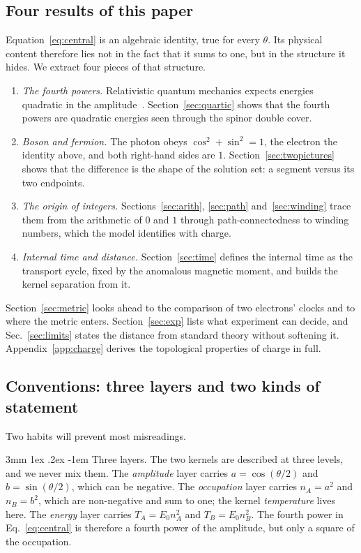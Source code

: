 \documentclass[%
 reprint, amsmath,amssymb, aps, prb, ]{revtex4-2}
\makeatletter
\numberwithin{equation}{section}
\renewcommand\paragraph{%
  \@startsection{paragraph}{4}{\z@}%
    {3mm \@plus 1ex \@minus .2ex}%
    {-1em}%
    {\normalfont\normalsize\itshape}}
\makeatother
\begin{document}
\subsection{Four results of this paper}

Equation~\eqref{eq:central} is an algebraic identity, true for every $\theta$. Its physical content therefore lies not in the fact that it sums to one, but in the structure it hides. We extract four pieces of that structure.
\begin{enumerate}[leftmargin=1.6em,itemsep=0.25em]
\item \emph{The fourth powers.} Relativistic quantum mechanics expects energies quadratic in the amplitude~\cite{ref:dirac28}. Section~\ref{sec:quartic} shows that the fourth powers are quadratic energies seen through the spinor double cover.
\item \emph{Boson and fermion.} The photon obeys $\cos^2+\sin^2=1$, the electron the identity above, and both right-hand sides are $1$. Section~\ref{sec:twopictures} shows that the difference is the shape of the solution set: a segment versus its two endpoints.
\item \emph{The origin of integers.} Sections~\ref{sec:arith}, \ref{sec:path} and~\ref{sec:winding} trace them from the arithmetic of $0$ and $1$ through path-connectedness to winding numbers, which the model identifies with charge.
\item \emph{Internal time and distance.} Section~\ref{sec:time} defines the internal time as the transport cycle, fixed by the anomalous magnetic moment, and builds the kernel separation from it.
\end{enumerate}
Section~\ref{sec:metric} looks ahead to the comparison of two electrons' clocks and to where the metric enters. Section~\ref{sec:exp} lists what experiment can decide, and Sec.~\ref{sec:limits} states the distance from standard theory without softening it. Appendix~\ref{app:charge} derives the topological properties of charge in full.

\subsection{Conventions: three layers and two kinds of statement}
\label{sec:conv}

Two habits will prevent most misreadings.

\paragraph{Three layers.} The two kernels are described at three levels, and we never mix them. The \emph{amplitude} layer carries $a=\cos(\theta/2)$ and $b=\sin(\theta/2)$, which can be negative. The \emph{occupation} layer carries $n_A=a^2$ and $n_B=b^2$, which are non-negative and sum to one; the kernel \emph{temperature} lives here. The \emph{energy} layer carries $T_A=E_0 n_A^2$ and $T_B=E_0 n_B^2$. The fourth power in Eq.~\eqref{eq:central} is therefore a fourth power of the amplitude, but only a square of the occupation.
\end{document}

